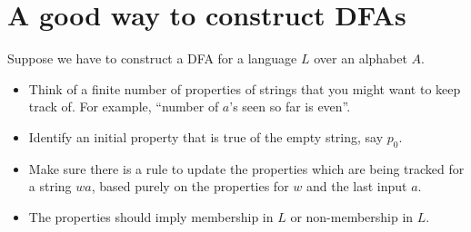 \section{A good way to construct DFAs} \label{sec:dfa:ideas}
Suppose we have to construct a DFA for a language $L$ over an alphabet $A$.
\begin{itemize}
    \item Think of a finite number of properties of strings that you might
    want to keep track of.
    For example, ``number of $a$'s seen so far is even''.
    \item Identify an initial property that is true of the empty string,
    say $p_0$.
    \item Make sure there is a rule to update the properties which are being
    tracked for a string $wa$, based purely on the properties for $w$ and
    the last input $a$.
    \item The properties should imply membership in $L$ or non-membership
    in $L$.
\end{itemize}

